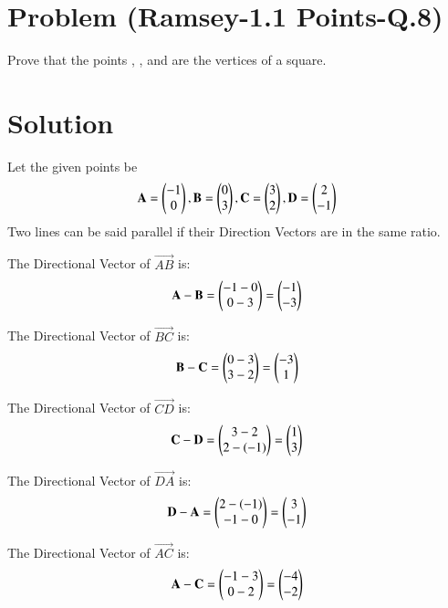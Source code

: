 \documentclass[journal,12pt,twocolumn]{IEEEtran}
\begin{document}
\section*{\textbf{Problem (Ramsey-1.1 Points-Q.8)}}
Prove that the points , ,  and  are the vertices of a square.
\section*{Solution}
Let the given points be
\begin{equation}
\mathbf{A} = \begin{pmatrix}-1\\0\end{pmatrix}, \mathbf{B} = \begin{pmatrix}0\\3\end{pmatrix}, \mathbf{C} = \begin{pmatrix}3\\2\end{pmatrix}, \mathbf{D} = \begin{pmatrix}2\\-1\end{pmatrix}
\end{equation}
Two lines can be said parallel if their Direction Vectors are in the same ratio.

The Directional Vector of $\vec{AB}$ is:
\begin{equation}
    \mathbf{A} - \mathbf{B} = \begin{pmatrix}-1-0\\0-3\end{pmatrix} = \begin{pmatrix}-1\\-3\end{pmatrix}
    \label{AB}
\end{equation}

The Directional Vector of $\vec{BC}$ is:
\begin{equation}
    \mathbf{B} - \mathbf{C} = \begin{pmatrix}0-3\\3-2\end{pmatrix} = \begin{pmatrix}-3\\1\end{pmatrix}
    \label{BC}
\end{equation}

The Directional Vector of $\vec{CD}$ is:
\begin{equation}
    \mathbf{C} - \mathbf{D} = \begin{pmatrix}3-2\\2-(-1)\end{pmatrix} = \begin{pmatrix}1\\3\end{pmatrix}
    \label{CD}
\end{equation}

The Directional Vector of $\vec{DA}$ is:
\begin{equation}
    \mathbf{D} - \mathbf{A} = \begin{pmatrix}2-(-1)\\-1-0\end{pmatrix} = \begin{pmatrix}3\\-1\end{pmatrix}
    \label{DA}
\end{equation}

The Directional Vector of $\vec{AC}$ is:
\begin{equation}
    \mathbf{A} - \mathbf{C} = \begin{pmatrix}-1-3\\0-2\end{pmatrix} = \begin{pmatrix}-4\\-2\end{pmatrix}
    \label{AC}
\end{equation}
\end{document}
